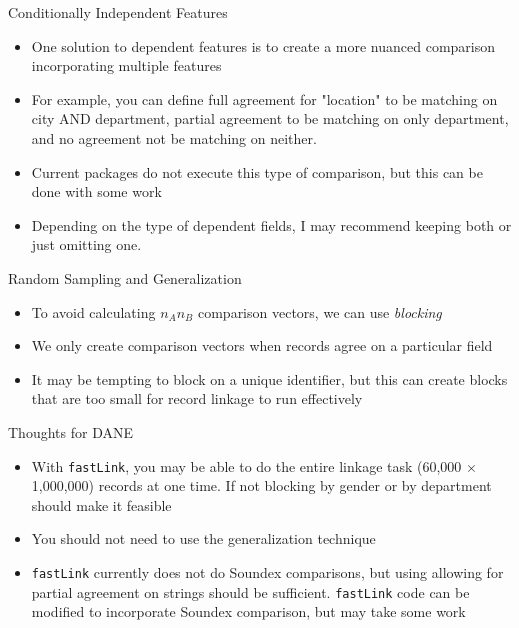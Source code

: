 \documentclass{beamer}
\begin{document}
\begin{frame}{Conditionally Independent Features}
	\begin{itemize}
		\item One solution to dependent features is to create a more nuanced comparison incorporating multiple features
		\item For example, you can define full agreement for "location" to be matching on city AND department, partial agreement to be matching on only department, and no agreement not be matching on neither.
		\item Current packages do not execute this type of comparison, but this can be done with some work
		\item Depending on the type of dependent fields, I may recommend keeping both or just omitting one. 
	\end{itemize}
\end{frame}

\begin{frame}{Random Sampling and Generalization}
	\begin{itemize}
		\item To avoid calculating $n_A n_B$ comparison vectors, we can use \emph{blocking}
		\item We only create comparison vectors when records agree on a particular field
		\item It may be tempting to block on a unique identifier, but this can create blocks that are too small for record linkage to run effectively
	\end{itemize}
\end{frame}

\begin{frame}{Thoughts for DANE}
	\begin{itemize}
		\item With \texttt{fastLink}, you may be able to do the entire linkage task (60,000 $\times$ 1,000,000) records at one time. If not blocking by gender or by department should make it feasible
		\item You should not need to use the generalization technique
		\item \texttt{fastLink} currently does not do Soundex comparisons, but using allowing for partial agreement on strings should be sufficient. \texttt{fastLink} code can be modified to incorporate Soundex comparison, but may take some work
	\end{itemize}
\end{frame}
\end{document}
